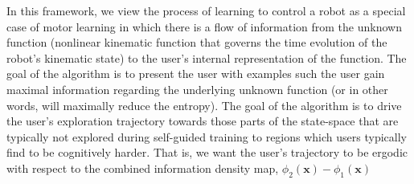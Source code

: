 \documentclass[12pt]{article}
\begin{document}
In this framework, we view the process of learning to control a robot as a special case of motor learning in which there is a flow of information from the unknown function (nonlinear kinematic function that governs the time evolution of the robot's kinematic state) to the user's internal representation of the function. The goal of the algorithm is to present the user with examples such the user gain maximal information regarding the underlying unknown function (or in other words, will maximally reduce the entropy). The goal of the algorithm is to drive the user's exploration trajectory towards those parts of the state-space that are typically not explored during self-guided training to regions which users typically find to be cognitively harder. That is, we want the user's trajectory to be ergodic with respect to the combined information density map, $\phi_{2}(\boldsymbol{x}) - \phi_{1}(\boldsymbol{x})$
\end{document}
